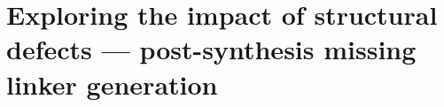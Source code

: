 
\graphicspath{ {\thisch/figures/} }

\chapter{Exploring the impact of structural defects --- post-synthesis missing linker generation}%
\label{def}








